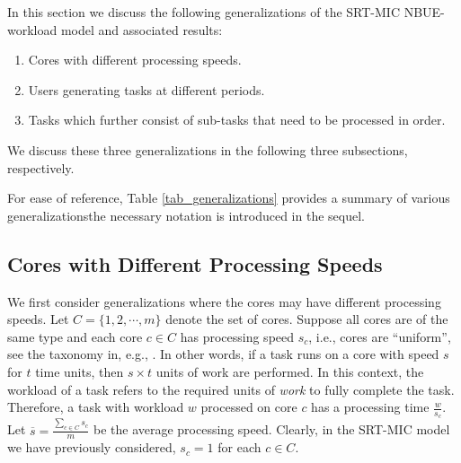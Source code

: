 \documentclass[prodmode,acmtompecs]{acmsmall}
\newcommand{\reqvec}{\mathbf{q}}
\newcommand{\fullUserSet}{N}
\begin{document}
\begin{table}
{
    }
\end{table}

In this section we discuss the following generalizations of the SRT-MIC NBUE-workload model and associated results: 
\begin{enumerate}
\item Cores with different processing speeds. 
\item Users generating tasks at different periods. 
\item Tasks which further consist of sub-tasks that need to be processed in order. 
\end{enumerate}
We discuss these three generalizations in the following three subsections, respectively. 

For ease of reference, Table \ref{tab_generalizations} provides a summary of various generalizations\textemdash the necessary notation is introduced in the sequel.  

\subsection{Cores with Different Processing Speeds}
We first consider generalizations where the cores may have different processing speeds. 
Let $C = \{1, 2, \cdots, m\}$ denote the set of cores. Suppose all cores are of the same type and each core $c\in C$ has processing speed $s_c$, 
i.e., cores are ``uniform'', see the taxonomy in, e.g., \cite{DaB11}. 
In other words, if a task runs on a core with speed $s$ for $t$ time units, then $s\times t$ units of work are performed. 
In this context, the workload of a task refers to the required units of \emph{work} to fully complete the task. 
Therefore, a task with workload $w$ processed on core $c$ has a processing time $\frac{w}{s_c}$.
Let $\overline{s} = \frac{\sum\limits_{c\in C} s_c}{m}$ be the average processing speed. 
Clearly, in the SRT-MIC model we have previously considered, $s_c = 1$ for each $c \in C$. 
\end{document}
